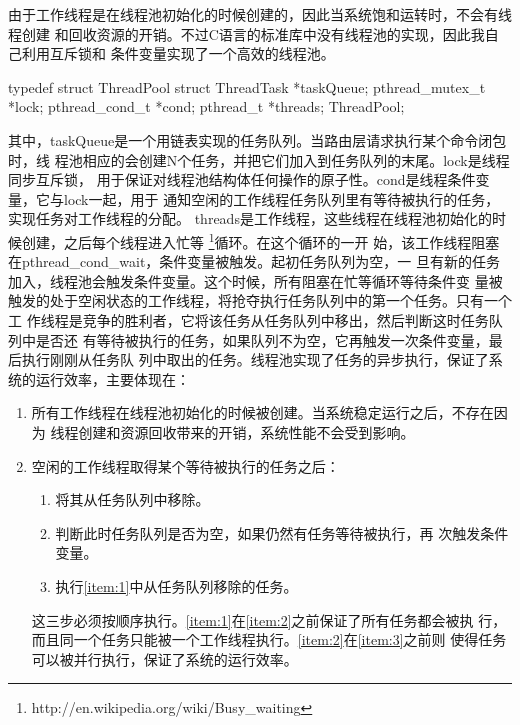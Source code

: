 由于工作线程是在线程池初始化的时候创建的，因此当系统饱和运转时，不会有线程创建
和回收资源的开销。不过C语言的标准库中没有线程池的实现，因此我自己利用互斥锁和
条件变量实现了一个高效的线程池。
\begin{code}
typedef struct ThreadPool {
  struct ThreadTask *taskQueue;
  pthread_mutex_t *lock;
  pthread_cond_t *cond;
  pthread_t *threads;
} ThreadPool;
\end{code}
其中，taskQueue是一个用链表实现的任务队列。当路由层请求执行某个命令闭包时，线
程池相应的会创建N个任务，并把它们加入到任务队列的末尾。lock是线程同步互斥锁，
用于保证对线程池结构体任何操作的原子性。cond是线程条件变量，它与lock一起，用于
通知空闲的工作线程任务队列里有等待被执行的任务，实现任务对工作线程的分配。
threads是工作线程，这些线程在线程池初始化的时候创建，之后每个线程进入忙等
\footnote{http://en.wikipedia.org/wiki/Busy\_waiting}循环。在这个循环的一开
始，该工作线程阻塞在pthread\_cond\_wait，条件变量被触发。起初任务队列为空，一
旦有新的任务加入，线程池会触发条件变量。这个时候，所有阻塞在忙等循环等待条件变
量被触发的处于空闲状态的工作线程，将抢夺执行任务队列中的第一个任务。只有一个工
作线程是竞争的胜利者，它将该任务从任务队列中移出，然后判断这时任务队列中是否还
有等待被执行的任务，如果队列不为空，它再触发一次条件变量，最后执行刚刚从任务队
列中取出的任务。线程池实现了任务的异步执行，保证了系统的运行效率，主要体现在：
\begin{enumerate}
  \item 所有工作线程在线程池初始化的时候被创建。当系统稳定运行之后，不存在因为
  线程创建和资源回收带来的开销，系统性能不会受到影响。
  \item 空闲的工作线程取得某个等待被执行的任务之后：
  \begin{enumerate}
    \item\label{item:1} 将其从任务队列中移除。
    \item\label{item:2} 判断此时任务队列是否为空，如果仍然有任务等待被执行，再
    次触发条件变量。
    \item\label{item:3} 执行\ref{item:1}中从任务队列移除的任务。
  \end{enumerate}
  这三步必须按顺序执行。\ref{item:1}在\ref{item:2}之前保证了所有任务都会被执
  行，而且同一个任务只能被一个工作线程执行。\ref{item:2}在\ref{item:3}之前则
  使得任务可以被并行执行，保证了系统的运行效率。
\end{enumerate}

